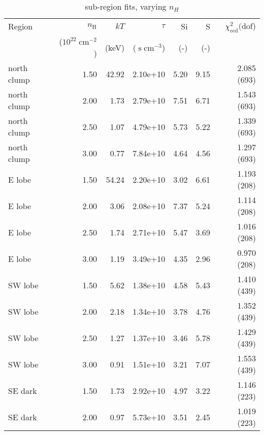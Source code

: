 \documentclass[twocolumn,tighten,trackchanges]{aastex6}
\newcommand*{\mt}{\mathrm}
\newcommand*{\unit}[1]{\;\mt{#1}}  %
\begin{document}
\begin{table*}
    \centering
    \caption{sub-region fits, varying $n_H$}
    \begin{tabular}{@{}lrrrrrr@{}}
        \toprule
        Region & $n_\mathrm{H}$             & $kT$  & $\tau$                & Si  & S   & $\chi^2_{\mathrm{red}} (\mathrm{dof}$) \\
               & ($10^{22} \unit{cm^{-2}}$) & (keV) & ($\unit{s\;cm^{-3}}$) & (-) & (-) &  \\
        \midrule
        north clump & 1.50 & 42.92 & 2.10e+10 & 5.20 & 9.15 & 2.085 (693) \\  %
        north clump & 2.00 & 1.73 & 2.79e+10 & 7.51 & 6.71 & 1.543 (693) \\  %
        north clump & 2.50 & 1.07 & 4.79e+10 & 5.73 & 5.22 & 1.339 (693) \\  %
        north clump & 3.00 & 0.77 & 7.84e+10 & 4.64 & 4.56 & 1.297 (693) \\  %
        \midrule
        E lobe & 1.50 & 54.24 & 2.20e+10 & 3.02 & 6.61 & 1.193 (208) \\  %
        E lobe & 2.00 & 3.06 & 2.08e+10 & 7.37 & 5.24 & 1.114 (208) \\  %
        E lobe & 2.50 & 1.74 & 2.71e+10 & 5.47 & 3.69 & 1.016 (208) \\  %
        E lobe & 3.00 & 1.19 & 3.49e+10 & 4.35 & 2.96 & 0.970 (208) \\  %
        \midrule
        SW lobe & 1.50 & 5.62 & 1.38e+10 & 4.58 & 5.43 & 1.410 (439) \\  %
        SW lobe & 2.00 & 2.18 & 1.34e+10 & 3.78 & 4.76 & 1.352 (439) \\  %
        SW lobe & 2.50 & 1.27 & 1.37e+10 & 3.46 & 5.78 & 1.429 (439) \\  %
        SW lobe & 3.00 & 0.91 & 1.51e+10 & 3.21 & 7.07 & 1.553 (439) \\  %
        \midrule
        SE dark & 1.50 & 1.73 & 2.92e+10 & 4.97 & 3.22 & 1.146 (223) \\  %
        SE dark & 2.00 & 0.97 & 5.73e+10 & 3.51 & 2.45 & 1.019 (223) \\  %

\end{tabular}
\end{table*}
\end{document}
